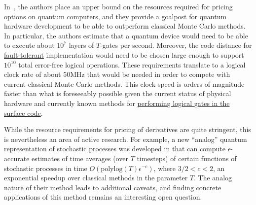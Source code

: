 \begin{refsection}
In~\cite{chakrabarti2021threshold}, the authors place an upper bound on the resources required for pricing options on quantum computers, and they provide a goalpost for quantum hardware development to be able to outperform classical Monte Carlo methods. In particular, the authors estimate that a quantum device would need to be able to execute about $10^7$ layers of $T$-gates per second. Moreover, the code distance for \hyperref[prim:FTQC]{fault-tolerant} implementation would need to be chosen large enough to support $10^{10}$ total error-free logical operations. These requirements translate to a logical clock rate of about $50$MHz that would be needed in order to compete with current classical Monte Carlo methods. This clock speed is orders of magnitude faster than what is foreseeably possible given the current status of physical hardware and currently known methods for \hyperref[prim:LatticeSurgery]{performing logical gates in the surface code}.

While the resource requirements for pricing of derivatives are quite stringent, this is nevertheless an area of active research. For example, a new ``analog'' quantum representation of stochastic processes was developed in \cite{bouland2023quantum} that can compute $\epsilon$-accurate estimates of time averages (over $T$ timesteps) of certain functions of stochastic processes in time $O(\mathrm{polylog}(T)\epsilon^{-c})$, where $3/2 < c <2$, an exponential speedup over classical methods in the parameter $T$. The analog nature of their method leads to additional caveats, and finding concrete applications of this method remains an interesting open question. 

\printbibliography[heading=secbib,segment=\therefsegment]

\end{refsection}


